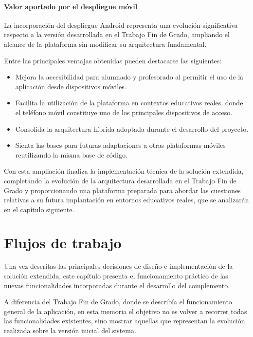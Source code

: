 \subsubsection{Valor aportado por el despliegue móvil}

La incorporación del despliegue Android representa una evolución significativa respecto a la versión desarrollada en el Trabajo Fin de Grado, ampliando el alcance de la plataforma sin modificar su arquitectura fundamental.

Entre las principales ventajas obtenidas pueden destacarse las siguientes:

\begin{itemize}
    \item Mejora la accesibilidad para alumnado y profesorado al permitir el uso de la aplicación desde dispositivos móviles.
    \item Facilita la utilización de la plataforma en contextos educativos reales, donde el teléfono móvil constituye uno de los principales dispositivos de acceso.
    \item Consolida la arquitectura híbrida adoptada durante el desarrollo del proyecto.
    \item Sienta las bases para futuras adaptaciones a otras plataformas móviles reutilizando la misma base de código.
\end{itemize}

Con esta ampliación finaliza la implementación técnica de la solución extendida, completando la evolución de la arquitectura desarrollada en el Trabajo Fin de Grado y proporcionando una plataforma preparada para abordar las cuestiones relativas a su futura implantación en entornos educativos reales, que se analizarán en el capítulo siguiente.

\chapter{Flujos de trabajo}
\label{chap:flujo}

Una vez descritas las principales decisiones de diseño e implementación de la solución extendida, este capítulo presenta el funcionamiento práctico de las nuevas funcionalidades incorporadas durante el desarrollo del complemento.

A diferencia del Trabajo Fin de Grado, donde se describía el funcionamiento general de la aplicación, en esta memoria el objetivo no es volver a recorrer todas las funcionalidades existentes, sino mostrar aquellas que representan la evolución realizada sobre la versión inicial del sistema.

